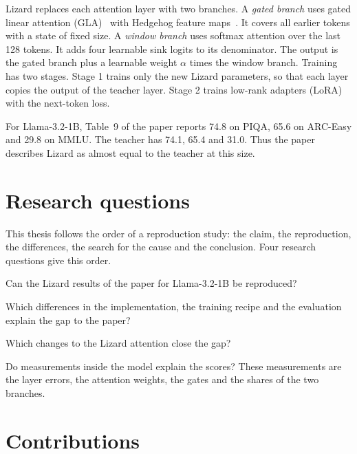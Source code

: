 Lizard replaces each attention layer with two branches. A \emph{gated branch} uses gated linear attention (GLA)~\cite{gla} with Hedgehog feature maps~\cite{hedgehog}. It covers all earlier tokens with a state of fixed size. A \emph{window branch} uses softmax attention over the last 128 tokens. It adds four learnable sink logits to its denominator. The output is the gated branch plus a learnable weight $\alpha$ times the window branch. Training has two stages. Stage 1 trains only the new Lizard parameters, so that each layer copies the output of the teacher layer. Stage 2 trains low-rank adapters (LoRA)~\cite{lora} with the next-token loss.

For Llama-3.2-1B, Table~9 of the paper reports 74.8 on PIQA, 65.6 on ARC-Easy and 29.8 on MMLU. The teacher has 74.1, 65.4 and 31.0. Thus the paper describes Lizard as almost equal to the teacher at this size.

\section{Research questions}
\label{sec:rq}

This thesis follows the order of a reproduction study: the claim, the reproduction, the differences, the search for the cause and the conclusion. Four research questions give this order.

\begin{description}[leftmargin=1.2cm,style=nextline]
\item[RQ1] Can the Lizard results of the paper for Llama-3.2-1B be reproduced?
\item[RQ2] Which differences in the implementation, the training recipe and the evaluation explain the gap to the paper?
\item[RQ3] Which changes to the Lizard attention close the gap?
\item[RQ4] Do measurements inside the model explain the scores? These measurements are the layer errors, the attention weights, the gates and the shares of the two branches.
\end{description}

\section{Contributions}
\label{sec:contrib}

